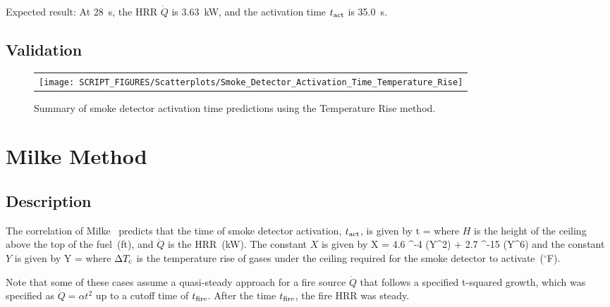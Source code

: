 \noindent Expected result: At 28~s, the HRR $\dot Q$ is 3.63~kW, and the activation time $t\sb{act}$ is 35.0~s.



\clearpage


\subsection*{Validation}

\begin{figure}[!ht]
\begin{center}
\begin{tabular}{l}
\texttt{[image: SCRIPT\_FIGURES/Scatterplots/Smoke\_Detector\_Activation\_Time\_Temperature\_Rise]}
\end{tabular}
\end{center}
\caption[Summary of smoke detector activation time predictions (Temperature Rise)]
{Summary of smoke detector activation time predictions using the Temperature Rise method.}
\label{Smoke_Detector_Activation_Summary_Temperature_Rise}
\end{figure}


\clearpage


\section{Milke Method}

\subsection*{Description}

The correlation of Milke~\cite{Milke:1} predicts that the time of smoke detector activation, $t\sb{act}$, is given by
\be
t = 
\label{eq:Milke}
\ee
where $H$ is the height of the ceiling above the top of the fuel~(\si{ft}), and $\dot Q$ is the HRR~(\si{kW}). The constant $X$ is given by
\be
X = 4.6 ^{-4} (Y^2) + 2.7 ^{-15} (Y^6)
\label{eq:Milke_X}
\ee
and the constant $Y$ is given by
\be
Y = 
\label{eq:Milke_Y}
\ee
where $\Delta T\sb{c}$ is the temperature rise of gases under the ceiling required for the smoke detector to activate~($^\circ$F).

Note that some of these cases assume a quasi-steady approach for a fire source $\dot Q$ that follows a specified t-squared growth, which was specified as $\dot Q = \alpha t^2$ up to a cutoff time of $t\sb{fire}$. After the time $t\sb{fire}$, the fire HRR was steady.

